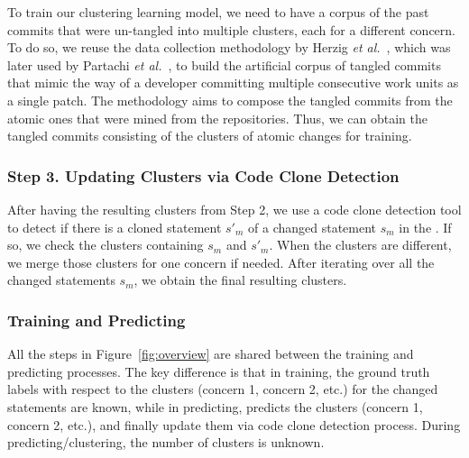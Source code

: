 \vspace{3pt}
 To train our clustering learning
model, we need to have a corpus of the past commits that were
un-tangled into multiple clusters, each for a different concern. To do
so, we reuse the data collection methodology by Herzig {\em et
  al.}~\cite{kim-emse16}, which was later used by Partachi {\em et
  al.}~\cite{flexeme-fse20}, to build the artificial corpus of tangled
commits that mimic the way of a developer committing multiple
consecutive work units as a single patch. The methodology aims to
compose the tangled commits from the atomic ones that were mined from
the repositories. Thus, we can obtain the tangled commits consisting
of the clusters of atomic changes for training.




\subsubsection{{\bf Step 3. Updating Clusters via Code Clone Detection}}

After having the resulting clusters from Step 2, we use a code clone
detection tool to detect if there is a cloned statement $s'_m$ of a
changed statement $s_m$ in the {\mvpdg}. If so, we check the clusters
containing $s_m$ and $s'_m$. When the clusters are different, we merge
those clusters for one concern if needed. After iterating over all the
changed statements $s_m$, we obtain the final resulting clusters.


\subsubsection*{Training and Predicting}
All the steps in Figure~\ref{fig:overview} are shared between the
training and predicting processes. The key difference is that in
training, the ground truth labels with respect to the clusters (concern 1,
concern 2, etc.) for the changed statements are known, while in
predicting, {\tool} predicts the clusters (concern 1, concern 2,
etc.), and finally update them via code clone detection process. During
predicting/clustering, the number of clusters is unknown.

